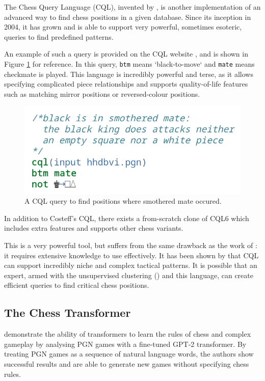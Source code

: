 The Chess Query Language (CQL), invented by \citet{cql}, is another
implementation of an advanced way to find chess positions in a given database.
Since its inception in 2004, it has grown and is able to support very powerful,
sometimes esoteric, queries to find predefined patterns.

An example of such a query is provided on the CQL website \citep{cqlSmothered},
and is shown in Figure \ref{cql} for reference. In this query, \texttt{btm}
means `black-to-move` and \texttt{mate} means checkmate is played. This
language is incredibly powerful and terse, as it allows specifying complicated
piece relationships and supports quality-of-life features such as matching
mirror positions or reversed-colour positions.

\begin{figure}[H]
    \centering
    \includegraphics[width=0.45\linewidth]{background/img/cql.png}
    \caption{A CQL query to find positions where smothered mate occured.}
    \label{cql}
\end{figure}

In addition to Costeff's CQL, there exists a from-scratch clone of CQL6
\citep{cqli} which includes extra features and supports other chess variants.

This is a very powerful tool, but suffers from the same drawback as the work of
\citet{chessLanguage}: it requires extensive knowledge to use effectively. It
has been shown by \citet{cql} that CQL can support incredibly niche and complex
tactical patterns. It is possible that an expert, armed with the unsupervised
clustering () and this language, can create efficient queries to
find critical chess positions.

\subsection{The Chess Transformer}\label{chessTransformerSection}

\citet{chessTransformer} demonstrate the ability of transformers to learn the
rules of chess and complex gameplay by analysing PGN games with a fine-tuned
GPT-2 transformer. By treating PGN games as a sequence of natural language
words, the authors show successful results and are able to generate new games
without specifying chess rules.

